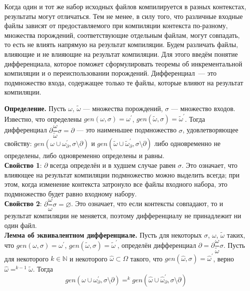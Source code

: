 
Когда один и тот же набор исходных файлов компилируется в разных контекстах, результаты могут отличаться. Тем не менее, в силу того, что различные входные файлы зависят от предоставляемого при компиляции контекста по-разному, множества порождений, соответствующие отдельным файлам, могут совпадать, то есть не влиять напрямую на результат компиляции. Будем различать файлы, влияющие и не влияющие на результат компиляции. Для этого введём понятие дифференциала, которое поможет сформулировать теоремы об инкрементальной компиляции и о переиспользовании порождений. Дифференциал~--- это подмножество входа, содержащее только те файлы, которые влияют на результат компиляции.

\textbf{Определение.} Пусть $\omega$, $\tilde{\omega}$ --- множества порождений, $\sigma$ --- множество входов. Известно, что определены $gen(\omega, \sigma) = \omega^\prime$, $gen(\tilde{\omega}, \sigma) = \tilde{\omega}^\prime$. Тогда дифференциал $\partial\dfrac{\omega}{\tilde{\omega}}\sigma = \partial$ --- это наименьшее подмножество $\sigma$, удовлетворяющее свойству: 
$gen(\omega \cup \omega^\prime_{\partial}, \sigma\setminus\partial)$ и
$gen(\tilde{\omega} \cup \tilde{\omega}^\prime_{\partial}, \sigma\setminus\partial)$ либо одновременно не определены, либо одновременно определены и равны.\\

\textbf{Свойство 1}: $\partial$ всегда определён и в худшем случае равен $\sigma$. Это означает, что влияющее на результат компиляции подмножество можно выделить всегда; при этом, когда изменение контекста затронуло все файлы входного набора, это подмножество будет равно входному набору.\\

\textbf{Свойство 2}: $\partial\dfrac{\omega}{\omega}\sigma = \varnothing$. Это означает, что если контексты совпадают, то и результат компиляции не меняется, поэтому дифференциалу не принадлежит ни один файл.\\

\textbf{Лемма об эквивалентном дифференциале.} Пусть для некоторых $\sigma$, $\omega$, $\tilde{\omega}$ таких, что $gen(\omega, \sigma) = \omega^\prime$, $gen(\tilde{\omega}, \sigma) = \tilde{\omega}^\prime$, определён дифференциал $\partial = \partial\dfrac{\omega}{\tilde{\omega}}\sigma$. Пусть для некоторого $k \in \mathbb{N}$ и некоторого $\hat{\omega} \subset \Omega$ такого, что $gen(\hat{\omega}, \sigma) = \hat{\omega}^\prime$, верно $\hat{\omega} =^{k-1} \tilde{\omega}$. Тогда $$gen(\omega \cup \omega^\prime_\partial, \sigma\setminus\partial) =^k gen(\hat{\omega} \cup \hat{\omega}^\prime_\partial, \sigma\setminus\partial)$$

